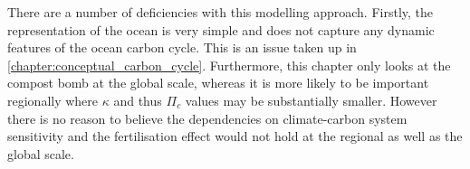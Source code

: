 There are a number of deficiencies with this modelling approach. Firstly, the representation of the ocean is very simple and does not capture any dynamic features of the ocean carbon
cycle. This is an issue taken up in \cref{chapter:conceptual_carbon_cycle}. Furthermore, this chapter only looks at the compost bomb at the global scale, whereas it is
more likely to be important regionally where $\kappa$ and thus $\Pi_c$ values may be substantially smaller. However there is no reason to believe the dependencies
on climate-carbon system sensitivity and the  fertilisation effect would not hold at the regional as well as the global scale.  
